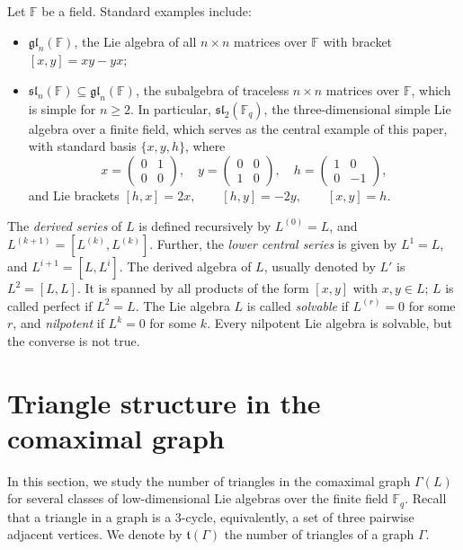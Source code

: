 \documentclass[11pt]{amsart}
\theoremstyle{plain}
\def\F{\mathbb{F}}
\begin{document}
 Let $\F$ be a field. Standard examples include: 
\begin{itemize}
\item $\mathfrak{gl}_n(\F)$, the Lie algebra of all $n \times n$ matrices over $\F$ with bracket $[x,y] = xy - yx$;
\item $\mathfrak{sl}_n(\F)\subseteq \mathfrak{gl}_n(\F)$, the subalgebra of traceless $n \times n$ matrices over $\F$, which is simple for $n\geq 2$. In particular, $\mathfrak{sl}_2(\F_q)$, the three-dimensional simple Lie algebra over a finite field, which serves as the central example of this paper, with standard basis $\{x, y, h\}$, where
   \[x =   \begin{pmatrix} 
0 & 1 \\ 0 & 0 
\end{pmatrix},
  \quad
  y =   \begin{pmatrix} 
  0 & 0 \\ 1 & 0 
  \end{pmatrix},
  \quad
  h =  \begin{pmatrix} 
  1 & 0 \\ 0 & -1 
  \end{pmatrix},\]
and Lie brackets $[h,x]=2x,\qquad [h,y]=-2y,\qquad [x,y]=h$. 
\end{itemize}

The \emph{derived series} of $L$ is defined recursively by $L^{(0)} = L$, and $L^{(k+1)} = [L^{(k)}, L^{(k)}]$.
Further, the \emph{lower central series} is given by $L^{1}=L$, and $L^{i+1}=[L,L^{i}]$. The derived algebra of $L$, usually denoted by $L'$ is $L^2 = [L, L]$. It is spanned by all products of the form $[x, y]$ with $x, y\in L$; $L$ is called perfect if $L^2 = L$. The Lie algebra $L$ is called \emph{solvable} if $L^{(r)} = 0$ for some $r$, and \emph{nilpotent} if $L^k = 0$ for some $k$. Every nilpotent Lie algebra is solvable, but the converse is not true.   
 

    
\section{Triangle structure in the comaximal graph} 

In this section, we study the number of triangles in the comaximal graph
$\Gamma(L)$ for several classes of low-dimensional Lie algebras over the
finite field $\F_q$. Recall that a triangle in a graph is a $3$-cycle, equivalently, a set of
three pairwise adjacent vertices. We denote by $\mathfrak{t}(\Gamma)$ the number of
triangles of a graph $\Gamma$.
\end{document}
